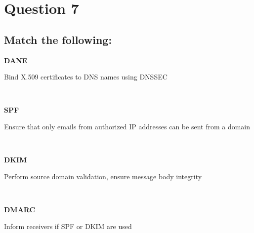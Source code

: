 \documentclass{report}
\begin{document}
	\section{Question 7}
	\startsection
		\renewcommand{\thesubsection}{\thesection.\Alph{subsection}}
		\subsection{Match the following:}
		\startsubsection
			\parbox{2.5cm}{\textbf{DANE}\dotfill} \parbox[t]{12cm}{Bind X.509 certificates to DNS names using DNSSEC} \\
			\parbox{2.5cm}{\textbf{SPF}\dotfill} \parbox[t]{12cm}{Ensure that only emails from authorized IP addresses can be sent from a domain} \\
			\parbox{2.5cm}{\textbf{DKIM}\dotfill} \parbox[t]{12cm}{Perform source domain validation, ensure message body integrity} \\
			\parbox{2.5cm}{\textbf{DMARC}\dotfill} \parbox[t]{12cm}{Inform receivers if SPF or DKIM are used} \\
		\closesection
	\closesection
\end{document}
